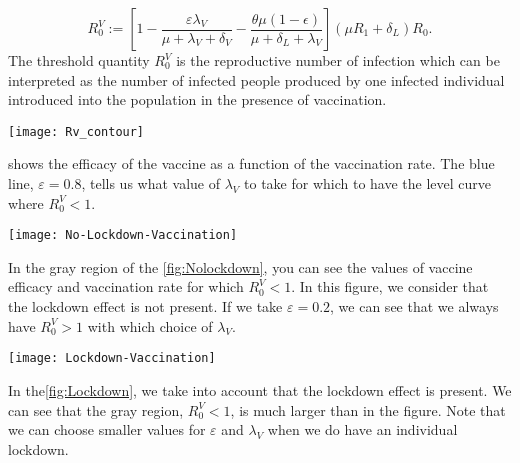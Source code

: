 \begin{equation*}
 R_{0}^V := \left[ 1-\frac{\varepsilon \lambda_V}
 {\mu+\lambda_V+\delta_V}
 -\frac{\theta\mu(1-\epsilon)}{\mu+\delta_L+\lambda_V}\right]
 (\mu R_1+\delta_L)R_0.
\end{equation*}
%
The threshold quantity $R_0^V$ is the reproductive number of infection
which can be interpreted as the number of infected people produced
by one infected individual introduced into the population in the
presence of vaccination.


\begin{figure*}[tbh]
    \centering
      \texttt{[image: Rv\_contour]}
    \caption{
    Contour plot  of $R_0^V$ as a function of $ \epsilon $ and $ \lambda_V $ and  
        vaccine-induced
        immunity average time of half year. orange line represents the 
        value of $\lambda_{Vbase}=\num{0.000611}$, corresponding to a coverage 
        $x_{coverage} = \num{0.2}$ and a horizon time $T=\num{365}$ days.
        Intersection of black line and blue line show a scenario in which it is
        possible to have the $R_V=0.65$, considering a vaccine efficacy of 
        \num{0.8} and a vaccination rate 
        of \num{0.7}.}
    \label{fig:rvcontour1}
\end{figure*}

shows the efficacy of the vaccine
as a function of the vaccination rate. The blue line, $ \varepsilon = 0.8 $,
tells us what value of $ \lambda_V $ to take for which to have
the level curve where $ R_0^V<1 $.
%
\begin{figure*}[tbh]
    \centering
      \texttt{[image: No-Lockdown-Vaccination]}
    \caption{
        Vaccine efficacy versus vaccination rate feasibility.
        In the gray shaded region $R_V<1 $ and in the white region $ R_V >1 $. 
        Note that, for our scenario, we consider no lockdown individuals.
    \href{https://plotly.com/~AdrianSalcedo/52/}{%
		https://plotly.com/~AdrianSalcedo/52/}
    }
    \label{fig:Nolockdown}
\end{figure*}
In the gray region of the \cref{fig:Nolockdown}, you can see
the values of vaccine efficacy and vaccination rate for which
$R_0^V <1 $. In this figure, we consider that the lockdown effect is not 
present.
If we take $ \varepsilon = 0.2 $, we can see that we always have $ R_0^V> 1 $
with which choice of $ \lambda_V $.
%
\begin{figure*}[tbh]
    \centering
      \texttt{[image: Lockdown-Vaccination]}
    \caption{%
        Vaccine efficacy versus vaccination rate feasibility.
        In the gray shaded region $R_V<1 $ and in the white region $ R_V >1 $. 
        Note that, for our scenario, we consider lockdown individuals.
        \href{https://plotly.com/~AdrianSalcedo/54/}{%
		https://plotly.com/~AdrianSalcedo/54/}
    }
    \label{fig:Lockdown}
\end{figure*}

In the\cref{fig:Lockdown}, we take into account that the lockdown effect is
present. We can see that the gray region, $ R_0 ^ V <1 $, is much larger than in
the figure. Note that we can choose smaller values for $ \varepsilon $ and $
\lambda_V $ when we do have an individual lockdown.
